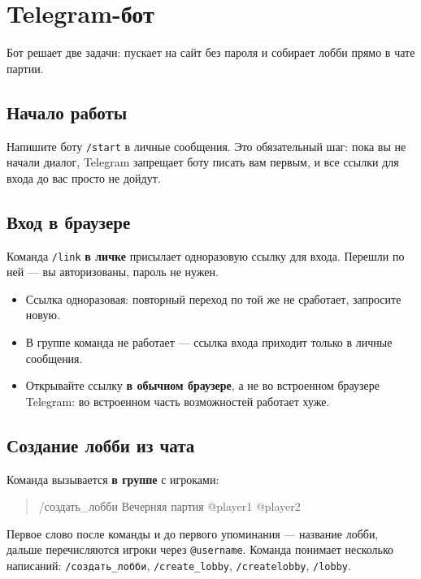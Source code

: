 \chapter{Telegram-бот}
\label{ch:telegram}

Бот решает две задачи: пускает на сайт без пароля и собирает лобби прямо в чате партии.

\section{Начало работы}
\label{sec:telegram:start}

Напишите боту \texttt{/start} в личные сообщения. Это обязательный шаг: пока вы не начали диалог, Telegram запрещает боту писать вам первым, и все ссылки для входа до вас просто не дойдут.

\section{Вход в браузере}
\label{sec:telegram:link}

Команда \texttt{/link} \textbf{в личке} присылает одноразовую ссылку для входа. Перешли по ней --- вы авторизованы, пароль не нужен.

\begin{itemize}
\item Ссылка одноразовая: повторный переход по той же не сработает, запросите новую.
\item В группе команда не работает --- ссылка входа приходит только в личные сообщения.
\item Открывайте ссылку \textbf{в обычном браузере}, а не во встроенном браузере Telegram: во встроенном часть возможностей работает хуже.
\end{itemize}

\section{Создание лобби из чата}
\label{sec:telegram:lobby}

Команда вызывается \textbf{в группе} с игроками:

\begin{quote}
\ttfamily
/создать\_лобби Вечерняя партия @player1 @player2
\end{quote}

Первое слово после команды и до первого упоминания --- название лобби, дальше перечисляются игроки через \texttt{@username}. Команда понимает несколько написаний: \texttt{/создать\_лобби}, \texttt{/create\_lobby}, \texttt{/createlobby}, \texttt{/lobby}.

